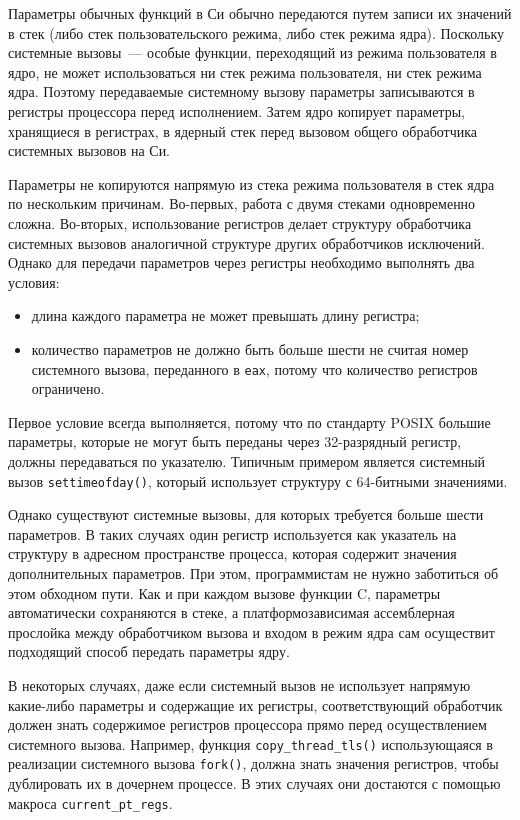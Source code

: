 Параметры обычных функций в Си обычно передаются путем записи их значений в стек
(либо стек пользовательского режима, либо стек режима ядра). Поскольку системные
вызовы~--- особые функции, переходящий из режима пользователя в ядро, не может
использоваться ни стек режима пользователя, ни стек режима ядра. Поэтому
передаваемые системному вызову параметры записываются в регистры процессора
перед исполнением. Затем ядро копирует параметры, хранящиеся в регистрах, в
ядерный стек перед вызовом общего обработчика системных вызовов на Си.

Параметры не копируются напрямую из стека режима пользователя в стек ядра по
нескольким причинам. Во-первых, работа с двумя стеками одновременно сложна.
Во-вторых, использование регистров делает структуру обработчика системных
вызовов аналогичной структуре других обработчиков исключений. Однако для
передачи параметров через регистры необходимо выполнять два условия:
\begin{itemize}
\item длина каждого параметра не может превышать длину регистра;
\item количество параметров не должно быть больше шести не считая номер
  системного вызова, переданного в \texttt{eax}, потому что количество регистров
  ограничено.
\end{itemize}

Первое условие всегда выполняется, потому что по стандарту POSIX большие
параметры, которые не могут быть переданы через 32-разрядный регистр, должны
передаваться по указателю. Типичным примером является системный вызов
\texttt{settimeofday()}, который использует структуру с 64-битными значениями.

Однако существуют системные вызовы, для которых требуется больше шести
параметров. В таких случаях один регистр используется как указатель на структуру
в адресном пространстве процесса, которая содержит значения дополнительных
параметров. При этом, программистам не нужно заботиться об этом обходном пути.
Как и при каждом вызове функции C, параметры автоматически сохраняются в стеке,
а платформозависимая ассемблерная прослойка между обработчиком вызова и входом в
режим ядра сам осуществит подходящий способ передать параметры ядру.

В некоторых случаях, даже если системный вызов не использует напрямую какие-либо
параметры и содержащие их регистры, соответствующий обработчик должен знать
содержимое регистров процессора прямо перед осуществлением системного вызова.
Например, функция \texttt{copy\_thread\_tls()} использующаяся в реализации системного
вызова \texttt{fork()}, должна знать значения регистров, чтобы дублировать их в
дочернем процессе. В этих случаях они достаются с помощью макроса \texttt{current\_pt\_regs}.

